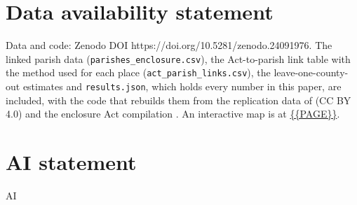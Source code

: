 \documentclass[11pt,a4paper]{article}
\begin{document}
\section*{Data availability statement}
Data and code: Zenodo DOI https://doi.org/10.5281/zenodo.24091976. The linked parish data (\texttt{parishes\_enclosure.csv}), the Act-to-parish link table with the method used for each place (\texttt{act\_parish\_links.csv}), the leave-one-county-out estimates and \texttt{results.json}, which holds every number in this paper, are included, with the code that rebuilds them from the replication data of \citet{caprettinivoth2020data} (CC BY 4.0) and the enclosure Act compilation \citep{hotham2026enclosure}. An interactive map is at \url{{{PAGE}}}.

\section*{AI statement}
{{AI}}
\end{document}
